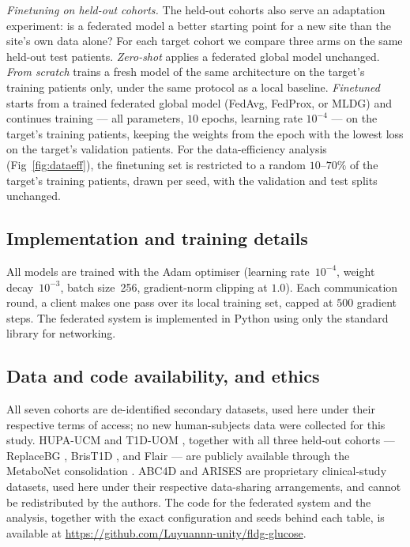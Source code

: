 \documentclass[10pt,letterpaper]{article}
\begin{document}
\emph{Finetuning on held-out cohorts.} The held-out cohorts also serve an
adaptation experiment: is a federated model a better starting point for a new
site than the site's own data alone? For each target cohort we compare three
arms on the same held-out test patients. \emph{Zero-shot} applies a federated
global model unchanged. \emph{From scratch} trains a fresh model of the same
architecture on the target's training patients only, under the same protocol
as a local baseline. \emph{Finetuned} starts from a trained federated global
model (FedAvg, FedProx, or MLDG) and continues training --- all parameters,
$10$ epochs, learning rate $10^{-4}$ --- on the target's training patients,
keeping the weights from the epoch with the lowest loss on the target's
validation patients. For the data-efficiency analysis (Fig~\ref{fig:dataeff}),
the finetuning set is restricted to a random $10$--$70\%$ of the target's
training patients, drawn per seed, with the validation and test splits
unchanged.

\subsection*{Implementation and training details}

All models are trained with the Adam optimiser (learning rate~$10^{-4}$, weight
decay~$10^{-3}$, batch size~256, gradient-norm clipping at $1.0$). Each
communication round, a client makes one pass over its local training set,
capped at $500$ gradient steps. The
federated system is implemented in Python using only the standard library for
networking.

\subsection*{Data and code availability, and ethics}

All seven cohorts are de-identified secondary datasets, used here under their
respective terms of access; no new human-subjects data were collected for this
study. HUPA-UCM \cite{hidalgo2024hupaucm} and T1D-UOM \cite{alsuhaymi2025t1duom},
together with all three held-out cohorts --- ReplaceBG
\cite{aleppo2017replacebg}, BrisT1D \cite{james2025brist1d}, and Flair
\cite{jaeb_flair} --- are publicly available through the MetaboNet consolidation
\cite{wolff2026metabonet}. ABC4D \cite{abc4d_nct} and ARISES
\cite{zhu2022arises} are proprietary clinical-study datasets, used here under
their respective data-sharing arrangements, and cannot be redistributed by the
authors. The code for the federated system and the analysis, together with the
exact configuration and seeds behind each table, is available at
\url{https://github.com/Luyuannn-unity/fldg-glucose}.
\end{document}
